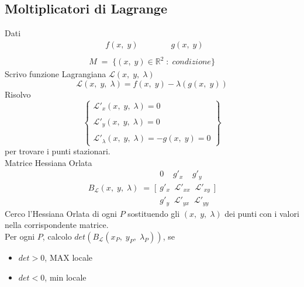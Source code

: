\documentclass[a4paper, 10pt]{article}
\begin{document}
			\subsection{Moltiplicatori di Lagrange}
				Dati
					\[
						\begin{array}{l}
							\quad\quad f(x,\; y)\quad\quad\quad\quad g(x,\; y) \\
							\\
							M\; =\; \{ (x,\; y) \in \mathbb{R}^2\; :\; condizione \}
						\end{array}
					\]
				Scrivo funzione Lagrangiana $ \mathcal{L}(x,\; y,\; \lambda) $
					\[
						\mathcal{L}(x,\; y,\; \lambda) = f(x,\; y) - \lambda(g(x,\; y))
					\]
				Risolvo
					\[
						\left\{ 
							\begin{array}{l} 
								\mathcal{L}'_x(x,\; y,\; \lambda) = 0 \\
								\\ 
								\mathcal{L}'_y(x,\; y,\; \lambda) = 0 \\
								\\
								\mathcal{L}'_\lambda(x,\; y,\; \lambda) = -g(x,\; y) = 0
							\end{array} 
						\right\}
					\]
				per trovare i punti stazionari.\\
				Matrice Hessiana Orlata
					\[
						B_\mathcal{L}(x,\; y,\; \lambda)\; =\; \Biggl[
							\begin{array}{l}
								0\;\;\;\; g'_x\;\;\;\; g'_y \\
								g'_x\;\; \mathcal{L}'_{xx}\;\; \mathcal{L}'_{xy} \\
								g'_y\;\; \mathcal{L}'_{yx}\;\; \mathcal{L}'_{yy}
							\end{array}
						\Biggl]
					\]
				Cerco l'Hessiana Orlata di ogni $ P $ sostituendo gli $ (x,\; y,\; \lambda) $ dei punti con i valori nella corrispondente matrice.\\
				Per ogni $ P $, calcolo $ det(B_\mathcal{L}(x_P,\; y_P,\; \lambda_P)) $, se
					\begin{itemize}
						\item $ det > 0 $, MAX locale
						\item $ det < 0 $, min locale
					\end{itemize}
				
\end{document}
